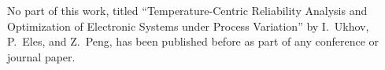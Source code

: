 No part of this work, titled ``Temperature-Centric Reliability Analysis and Optimization of Electronic Systems under Process Variation'' by I.~Ukhov, P.~Eles, and Z.~Peng, has been published before as part of any conference or journal paper.
